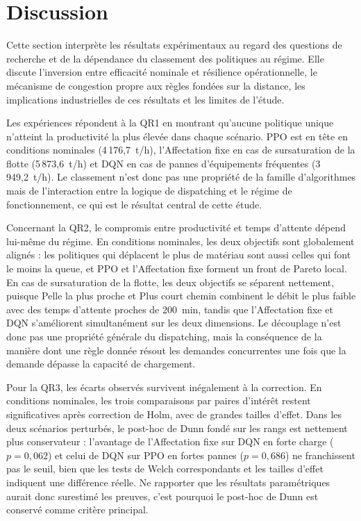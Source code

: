 \documentclass[11pt,a4paper]{article}
\begin{document}
\section{Discussion}
\label{sec:discussion}

Cette section interprète les résultats expérimentaux au regard des questions de recherche et de la dépendance du classement des politiques au régime. Elle discute l'inversion entre efficacité nominale et résilience opérationnelle, le mécanisme de congestion propre aux règles fondées sur la distance, les implications industrielles de ces résultats et les limites de l'étude.

Les expériences répondent à la QR1 en montrant qu'aucune politique unique n'atteint la productivité la plus élevée dans chaque scénario. PPO est en tête en conditions nominales (4\,176,7~t/h), l'Affectation fixe en cas de sursaturation de la flotte (5\,873,6~t/h) et DQN en cas de pannes d'équipements fréquentes (3\,949,2~t/h). Le classement n'est donc pas une propriété de la famille d'algorithmes mais de l'interaction entre la logique de dispatching et le régime de fonctionnement, ce qui est le résultat central de cette étude.

Concernant la QR2, le compromis entre productivité et temps d'attente dépend lui-même du régime. En conditions nominales, les deux objectifs sont globalement alignés : les politiques qui déplacent le plus de matériau sont aussi celles qui font le moins la queue, et PPO et l'Affectation fixe forment un front de Pareto local. En cas de sursaturation de la flotte, les deux objectifs se séparent nettement, puisque Pelle la plus proche et Plus court chemin combinent le débit le plus faible avec des temps d'attente proches de 200~min, tandis que l'Affectation fixe et DQN s'améliorent simultanément sur les deux dimensions. Le découplage n'est donc pas une propriété générale du dispatching, mais la conséquence de la manière dont une règle donnée résout les demandes concurrentes une fois que la demande dépasse la capacité de chargement.

Pour la QR3, les écarts observés survivent inégalement à la correction. En conditions nominales, les trois comparaisons par paires d'intérêt restent significatives après correction de Holm, avec de grandes tailles d'effet. Dans les deux scénarios perturbés, le post-hoc de Dunn fondé sur les rangs est nettement plus conservateur : l'avantage de l'Affectation fixe sur DQN en forte charge ($p=0{,}062$) et celui de DQN sur PPO en fortes pannes ($p=0{,}686$) ne franchissent pas le seuil, bien que les tests de Welch correspondants et les tailles d'effet indiquent une différence réelle. Ne rapporter que les résultats paramétriques aurait donc surestimé les preuves, c'est pourquoi le post-hoc de Dunn est conservé comme critère principal.
\end{document}
